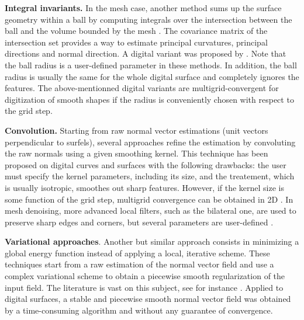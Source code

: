 \noindent\textbf{Integral invariants.}
In the mesh case, another method sums up the surface geometry within a ball by 
computing integrals over the intersection between the ball and the volume
bounded by the mesh \cite{Pottmann2009}. The covariance matrix of the intersection set 
provides a way to estimate principal curvatures, principal directions and normal direction.
A digital variant was proposed by \citeauthor*{Lachaud2017} \cite{Lachaud2017}.
%
Note that the ball radius is a user-defined parameter in these
methods. In addition, the ball radius is usually the same for
the whole digital surface and completely ignores the features.
The above-mentionned digital variants \cite{Cuel2015,Lachaud2017}
are multigrid-convergent for digitization of smooth shapes if
the radius is conveniently chosen with respect to
the grid step.

\noindent\textbf{Convolution.}
Starting from raw normal vector estimations (\eg unit
vectors perpendicular to surfels), several approaches refine the
estimation by convoluting the raw normals using a given smoothing
kernel. This technique has been proposed on digital curves
\cite{Esbelin2011,Esbelin2016} and surfaces
\cite{papierthese,Fourey2009} with the following drawbacks:
the user must specify the kernel parameters, including its size,
and the treatement, which is usually isotropic, smoothes out
sharp features. However, if the kernel size is some function of the
grid step, multigrid convergence can be obtained in 2D \cite{Esbelin2011}.
In mesh denoising, more advanced local filters, such as the bilateral one,
are used to preserve sharp edges and corners, but several parameters
are user-defined \cite{fleishman2003bilateral,zheng2011bilateral}.

\noindent\textbf{Variational approaches}. Another but similar approach
consists in minimizing a global energy function instead of applying a
local, iterative scheme. These techniques start from a raw estimation
of the normal vector field and use a complex variational scheme to obtain
a piecewise smooth regularization of the input field. The literature is
vast on this subject, see for instance \cite{zhang2015variational}. 
Applied to digital surfaces, a stable and piecewise smooth normal vector field
was obtained \cite{CoeurjollyFGL16} by a time-consuming algorithm and without
any guarantee of convergence. 

